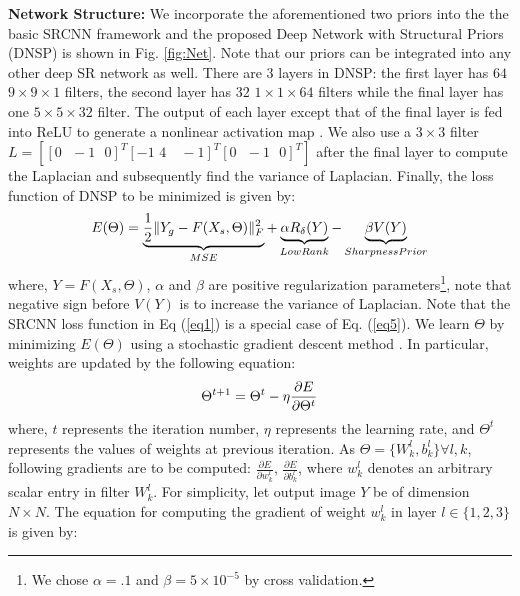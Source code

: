 \documentclass{article}
\def\sqz{\vspace{-3pt}}
\begin{document}
\noindent \textbf{Network Structure:} We incorporate the aforementioned two priors into the the basic SRCNN \cite{dong2016image} framework and the proposed Deep Network with Structural Priors (DNSP) is shown in Fig. \ref{fig:Net}. Note that our priors can be integrated into any other deep SR network as well. There are 3 layers in DNSP: the first layer has $64$ $9\times 9\times 1$ filters, the second layer has $32$ $1\times 1\times 64$ filters while the final layer has one $5\times 5\times 32$ filter. The output of each layer except that of the final layer is fed into ReLU to generate a nonlinear activation map \cite{nair2010rectified}. We also use a $3\times 3$ filter $L = [[0 \mbox{ }- 1 \mbox{ }0]^{T} [-1 \mbox{   4 } \mbox{ }-1]^{T} [0\mbox{ } - 1\mbox{ } 0]^{T}]$ after the final layer to compute the Laplacian and subsequently find the variance of Laplacian. Finally, the loss function of DNSP to be minimized is given by:\vspace{-5pt}
\begin{equation}\label{eq5}
E(\Theta) = \underbrace{\frac{1}{2}\|Y_{g} - F(X_{s}, \Theta)\|_{F}^{2}}_{MSE} + \underbrace{\alpha R_{\delta}(Y)}_{Low Rank} - \underbrace{\beta V(Y)}_{Sharpness Prior}\sqz\sqz
\end{equation}
where, $Y = F(X_{s}, \Theta)$, $\alpha$ and $\beta$ are positive regularization parameters\footnote{We chose $\alpha = .1$ and $\beta = 5\times 10^{-5}$ by cross validation.}, note that negative sign before $V(Y)$ is to increase the variance of Laplacian. Note that the SRCNN loss function in Eq (\ref{eq1}) is a special case of Eq. (\ref{eq5}). We learn $\Theta$ by minimizing $E(\Theta)$ using a stochastic gradient descent method \cite{lecun1998gradient, werbos1994roots}. In particular, weights are updated by the following equation:\sqz\sqz
\begin{equation}\label{eqUpdate}
\Theta^{t+1} = \Theta^{t} - \eta\frac{\partial E}{\partial\Theta^{t}}\sqz\sqz
\end{equation}
where, $t$ represents the iteration number, $\eta$ represents the learning rate, and $\Theta^{t}$ represents the values of weights at previous iteration. As $\Theta = \{W_{k}^{l}, b_{k}^{l}\} \forall l,k$, following gradients are to be computed: $\frac{\partial E}{\partial w_{k}^{l}}$, $\frac{\partial E}{\partial b_{k}^{l}}$, where $w_{k}^{l}$ denotes an arbitrary scalar entry in filter $W_{k}^{l}$. For simplicity, let output image $Y$ be of dimension $N\times N$. The equation for computing the gradient of weight $w_{k}^{l}$ in layer $l\in\{1,2,3\}$ is given by:\vspace{-5pt}
\end{document}
